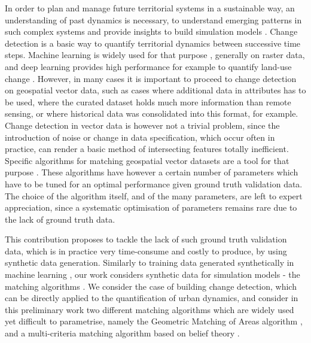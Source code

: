 \documentclass[11pt]{article}
\begin{document}
In order to plan and manage future territorial systems in a sustainable way, an understanding of past dynamics is necessary, to understand emerging patterns in such complex systems and provide insights to build simulation models \cite{rozenblat2018conclusion}. Change detection is a basic way to quantify territorial dynamics between successive time steps. Machine learning is widely used for that purpose \cite{wang2022machine}, generally on raster data, and deep learning provides high performance for example to quantify land-use change \cite{khelifi2020deep}. However, in many cases it is important to proceed to change detection on geospatial vector data, such as cases where additional data in attributes has to be used, where the curated dataset holds much more information than remote sensing, or where historical data was consolidated into this format, for example. Change detection in vector data is however not a trivial problem, since the introduction of noise or change in data specification, which occur often in practice, can render a basic method of intersecting features totally inefficient. Specific algorithms for matching geospatial vector datasets are a tool for that purpose \cite{xavier2016survey}. These algorithms have however a certain number of parameters which have to be tuned for an optimal performance given ground truth validation data. The choice of the algorithm itself, and of the many parameters, are left to expert appreciation, since a systematic optimisation of parameters remains rare due to the lack of ground truth data.

This contribution proposes to tackle the lack of such ground truth validation data, which is in practice very time-consume and costly to produce, by using synthetic data generation. Similarly to training data generated synthetically in machine learning \cite{nikolenko2021synthetic}, our work considers synthetic data for simulation models - the matching algorithms \cite{raimbault2019second}. We consider the case of building change detection, which can be directly applied to the quantification of urban dynamics, and consider in this preliminary work two different matching algorithms which are widely used yet difficult to parametrise, namely the Geometric Matching of Areas algorithm \cite{harvey1998geometric}, and a multi-criteria matching algorithm based on belief theory \cite{olteanu2008data}.
\end{document}
